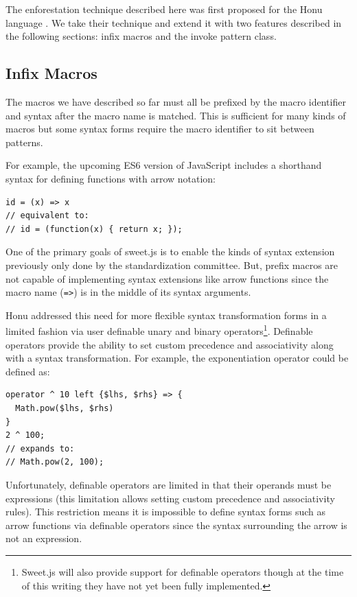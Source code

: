 \documentclass[preprint,10pt]{sigplanconf}
\begin{document}
The enforestation technique described here was first proposed for the
Honu language \cite{Rafkind2013}. We take their technique and extend
it with two features described in the following sections:
infix macros and the invoke pattern class.

\subsection{Infix Macros}
\label{sec:infix}
The macros we have described so far must all be prefixed by the macro
identifier and syntax after the macro name is matched. This is
sufficient for many kinds of macros but some syntax forms require the
macro identifier to sit between patterns.

For example, the upcoming ES6 version of JavaScript includes a
shorthand syntax for defining functions with arrow notation:

\begin{lstlisting}
id = (x) => x
// equivalent to:
// id = (function(x) { return x; });
\end{lstlisting}

One of the primary goals of sweet.js is to enable the kinds of syntax
extension previously only done by the standardization committee. But,
prefix macros are not capable of implementing syntax extensions like
arrow functions since the macro name (\verb!=>!) is in the middle
of its syntax arguments.

Honu addressed this need for more flexible syntax transformation forms
in a limited fashion via user definable unary and binary
operators\footnote{Sweet.js will also provide support for definable
  operators though at the time of this writing they have not yet been
  fully implemented.}. Definable operators provide the ability to set
custom precedence and associativity along with a syntax
transformation. For example, the exponentiation operator could be
defined as:
\begin{lstlisting}
operator ^ 10 left {$lhs, $rhs} => {
  Math.pow($lhs, $rhs)
}
2 ^ 100;
// expands to:
// Math.pow(2, 100);
\end{lstlisting}

Unfortunately, definable operators are limited in that their operands
must be expressions (this limitation allows setting custom precedence
and associativity rules). This restriction means it is impossible to
define syntax forms such as arrow functions via definable operators
since the syntax surrounding the arrow is not an expression.
\end{document}
